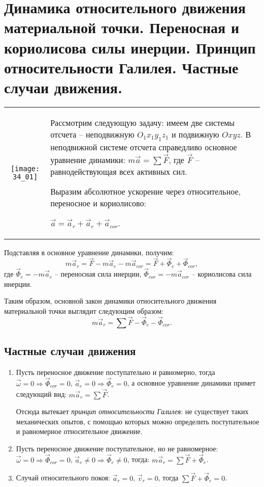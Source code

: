 \chapter{Динамика относительного движения материальной точки. Переносная и
кориолисова силы инерции. Принцип относительности Галилея. Частные случаи
движения.}

\begin{table}[h!]
\begin{tabular}{C{.4}m{.55\textwidth}}
\texttt{[image: 34\_01]} &
Рассмотрим следующую задачу: имеем две системы отсчета -- неподвижную
\( O_1x_1y_1z_1 \) и подвижную \( Oxyz \). В неподвижной системе отсчета
справедливо основное уравнение динамики: \( m\vec{a} = \sum\vec{F} \), где
\( \vec{F} \) -- равнодействующая всех активных сил.

Выразим абсолютное ускорение через относительное, переносное и кориолисово:

\( \vec{a} = \vec{a}_r + \vec{a}_e +\vec{a}_{cor} \). 
\end{tabular}
\end{table}

Подставляя в основное уравнение динамики, получим:
\[
    m\vec{a}_r = \vec{F} - m\vec{a}_e - m\vec{a}_{cor} = \vec{F} +
    \vec{\varPhi}_e + \vec{\varPhi}_{cor},
\]
где \( \vec{\varPhi}_e = -m\vec{a}_e \) -- переносная сила инерции,
\( \vec{\varPhi}_{cor} = -m\vec{a}_{cor} \) -- кориолисова сила инерции.

Таким образом, основной закон динамики относительного движения материальной
точки выглядит следующим образом:
\[
    m\vec{a}_r = \sum\vec{F} - \vec{\varPhi}_e - \vec{\varPhi}_{cor}.
\]

\section{Частные случаи движения}
\begin{enumerate}
    \item Пусть переносное движение поступательно и равномерно, тогда
    \( \vec{\omega} = 0 \Rightarrow \vec{\varPhi}_{cor} = 0 \),
    \( \vec{a}_e = 0 \Rightarrow \vec{\varPhi}_e = 0 \), а основное уравнение
    динамики примет следующий вид: \( m\vec{a}_r = \sum\vec{F} \).
    
    Отсюда вытекает \emph{принцип относительности Галилея}: не существует таких
    механических опытов, с помощью которых можно определить поступательное и
    равномерное относительное движение.
    
    \item Пусть переносное движение поступательное, но не равномерное:
    \( \vec{\omega} = 0 \Rightarrow \vec{\varPhi}_{cor} = 0 \),
    \( \vec{a}_e \ne 0 \Rightarrow \vec{\varPhi}_e \ne 0 \), тогда:
    \( m\vec{a}_r = \sum\vec{F} + \vec{\varPhi}_e \).
    
    \item Случай относительного покоя: \( \vec{a}_r = 0 \), \( \vec{v}_r = 0 \),
    тогда \( \sum\vec{F} + \vec{\varPhi}_e = 0 \).
\end{enumerate}

\newpage
